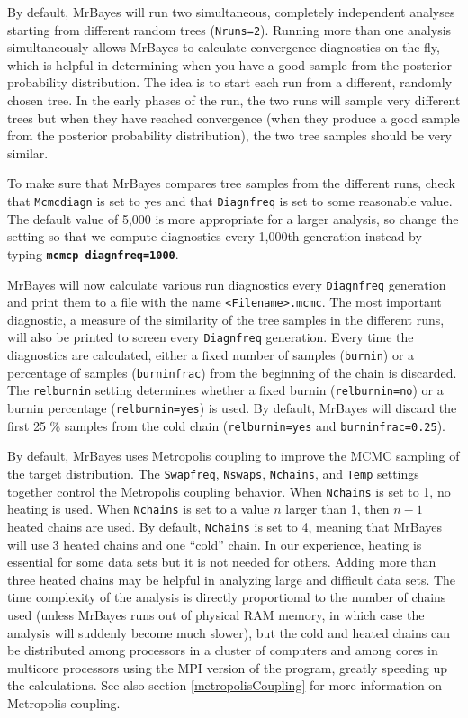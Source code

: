 \documentclass[12pt]{book}
\newcommand{\ttt}[1]{\texttt{#1}}
\newcommand{\tb}[1]{\ttt{\textbf{#1}}}
\begin{document}
By default, MrBayes will run two simultaneous, completely independent analyses starting from
different random trees (\texttt{Nruns=2}). Running more than one analysis simultaneously allows
MrBayes to calculate convergence diagnostics on the fly, which is helpful in determining when you
have a good sample from the posterior probability distribution. The idea is to start each run from
a different, randomly chosen tree. In the early phases of the run, the two runs will sample very
different trees but when they have reached convergence (when they produce a good sample from the
posterior probability distribution), the two tree samples should be very similar.

To make sure that MrBayes compares tree samples from the different runs, check that
\texttt{Mcmcdiagn} is set to yes and that \texttt{Diagnfreq} is set to some reasonable value. The
default value of 5,000 is more appropriate for a larger analysis, so change the setting so that we
compute diagnostics every 1,000th generation instead by typing \tb{mcmcp diagnfreq=1000}.

MrBayes will now calculate various run diagnostics every \texttt{Diagnfreq} generation and print
them to a file with the name \texttt{<Filename>.mcmc}. The most important diagnostic, a measure of
the similarity of the tree samples in the different runs, will also be printed to screen every
\texttt{Diagnfreq} generation. Every time the diagnostics are calculated, either a fixed number of
samples (\texttt{burnin}) or a percentage of samples (\texttt{burninfrac}) from the beginning of
the chain is discarded. The \texttt{relburnin} setting determines whether a fixed burnin
(\texttt{relburnin=no}) or a burnin percentage (\texttt{relburnin=yes}) is used. By default,
MrBayes will discard the first 25 \% samples from the cold chain (\texttt{relburnin=yes} and
\texttt{burninfrac=0.25}).

By default, MrBayes uses Metropolis coupling to improve the MCMC sampling of the target
distribution. The \texttt{Swapfreq}, \texttt{Nswaps}, \texttt{Nchains}, and \texttt{Temp} settings
together control the Metropolis coupling behavior. When \texttt{Nchains} is set to 1, no heating is
used. When \texttt{Nchains} is set to a value $n$ larger than 1, then $n - 1$ heated chains are
used. By default, \texttt{Nchains} is set to 4, meaning that MrBayes will use 3 heated chains and
one ``cold'' chain. In our experience, heating is essential for some data sets but it is not needed
for others. Adding more than three heated chains may be helpful in analyzing large and difficult
data sets. The time complexity of the analysis is directly proportional to the number of chains
used (unless MrBayes runs out of physical RAM memory, in which case the analysis will suddenly
become much slower), but the cold and heated chains can be distributed among processors in a
cluster of computers and among cores in multicore processors using the MPI version of the program,
greatly speeding up the calculations. See also section \ref{metropolisCoupling} for more
information on Metropolis coupling.
\end{document}
